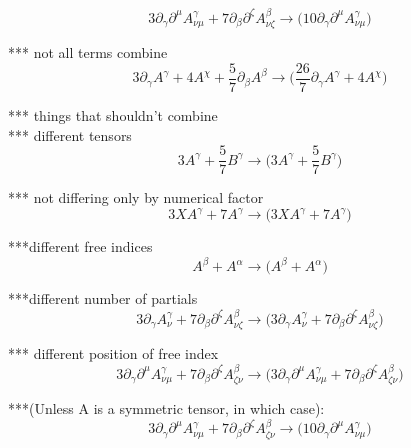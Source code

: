 \documentclass{article}
\def\){\Big)}
\def\({\Big(}
\begin{document}
\begin{equation}
3\partial_{\gamma}\partial^{\mu}A^{\gamma}_{\nu \mu} + 7 \partial_{\beta}\partial^{\zeta}A^{\beta}_{\nu \zeta} \rightarrow 
 \(10 \partial_{\gamma}\partial^{\mu}A_{\nu \mu}^{\gamma} \)
\end{equation}

*** not all terms combine 
\begin{equation}
3\partial_{\gamma}A^{\gamma} + 4 A^{\chi}+ \frac{5}{7} \partial_{\beta}A^{\beta} \rightarrow 
 \(\frac{26}{7} \partial_{\gamma}A^{\gamma} +4 A^{\chi} \)
\end{equation}

*** things that shouldn’t combine\\

*** different tensors
\begin{equation}
3A^{\gamma} + \frac{5}{7} B^{\gamma} \rightarrow  
\(3 A^{\gamma} +\frac{5}{7} B^{\gamma} \)
\end{equation}

*** not differing only by numerical factor
\begin{equation}
3XA^{\gamma} + 7 A^{\gamma}  \rightarrow 
\(3 X A^{\gamma} +7 A^{\gamma} \)
\end{equation}

***different free indices
\begin{equation}
A^{\beta} + A^{\alpha} \rightarrow 
\( A^{\beta} + A^{\alpha} \)
\end{equation}

***different number of partials
\begin{equation}
3\partial_{\gamma}A^{\gamma}_{\nu} + 7 \partial_{\beta}\partial^{\zeta}A^{\beta}_{\nu \zeta} \rightarrow 
\(3 \partial_{\gamma}A_{\nu}^{\gamma} +7 \partial_{\beta}\partial^{\zeta}A_{\nu \zeta}^{\beta} \)
\end{equation}

*** different position of free index
\begin{equation}
3\partial_{\gamma}\partial^{\mu}A^{\gamma}_{\nu \mu} + 7 \partial_{\beta}\partial^{\zeta}A^{\beta}_{\zeta \nu} \rightarrow 
\(3 \partial_{\gamma}\partial^{\mu}A_{\nu \mu}^{\gamma} +7 \partial_{\beta}\partial^{\zeta}A_{\zeta \nu}^{\beta} \)
\end{equation}

***(Unless A is a symmetric tensor, in which case):
\begin{equation}
3\partial_{\gamma}\partial^{\mu}A^{\gamma}_{\nu \mu} + 7 \partial_{\beta}\partial^{\zeta}A^{\beta}_{\zeta \nu} \rightarrow 
\(10 \partial_{\gamma}\partial^{\mu}A_{\nu \mu}^{\gamma} \)
\end{equation}
\end{document}
